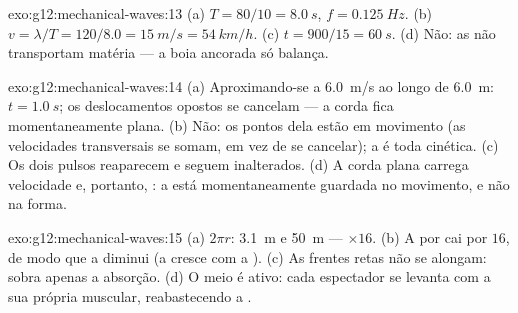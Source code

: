 \begin{solution}{exo:g12:mechanical-waves:13}
(a) $T = 80/10 = \qty{8.0}{s}$, $f = \qty{0.125}{Hz}$.
(b) $v = \lambda/T = 120/8.0 = \qty{15}{m/s} = \qty{54}{km/h}$.
(c) $t = 900/15 = \qty{60}{s}$. (d) Não: as  não transportam
matéria --- a boia ancorada só balança.
\end{solution}

\begin{solution}{exo:g12:mechanical-waves:14}
(a) Aproximando-se a \qty{6.0}{m/s} ao longo de \qty{6.0}{m}:
$t = \qty{1.0}{s}$; os deslocamentos opostos se cancelam --- a corda fica
momentaneamente plana. (b) Não: os pontos dela estão em movimento (as
velocidades transversais se somam, em vez de se cancelar); a  é
toda cinética. (c) Os dois pulsos reaparecem e seguem inalterados. (d) A
corda plana carrega velocidade e, portanto, : a  está
momentaneamente guardada no movimento, e não na forma.
\end{solution}

\begin{solution}{exo:g12:mechanical-waves:15}
(a) $2\pi r$: \qty{3.1}{m} e \qty{50}{m} --- $\times 16$. (b) A 
por  cai por $16$, de modo que a  diminui (a  cresce
com a ). (c) As frentes retas não se alongam: sobra apenas a
absorção. (d) O meio é ativo: cada espectador se levanta com a sua
própria  muscular, reabastecendo a .
\end{solution}

